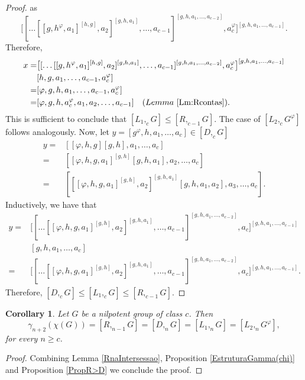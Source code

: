 \documentclass[12pt,leqno]{amsart}
\newtheorem{cor}[theorem]{\sc Corollary}
\begin{document}
\begin{proof}
        as
        \[
\big [ [\ldots[[g,h^{\varphi},a_{1}]^{[h,g]},a_{2}]^{[g,h,a_{1}]}, \ldots ,a_{c-1}]^{[g,h,a_{1}, \ldots ,a_{c-2}]} , a^{\varphi}_c \big]^{[g,h,a_{1}, \ldots, a_{c-1}]}.       
        \]
        Therefore, 
        \begin{align*} x=&\big [ [\ldots[[g,h^{\varphi},a_{1}]^{[h,g]},a_{2}]^{[g,h,a_{1}]}, \ldots ,a_{c-1}]^{[g,h,a_{1}, \ldots ,a_{c-2}]} , a^{\varphi}_c \big]^{[g,h,a_{1}, \ldots, a_{c-1}]} \\
        & [h,g,a_1, \ldots , a_{c-1}, a^{\varphi}_{c}]\\
        =& [\varphi,g,h,a_1,\ldots, a_{c-1},a^{\varphi}_{c}]\\
        =& [\varphi,g,h,a^{\varphi}_{c},a_1,a_2,\ldots, a_{c-1}] \ \ \ (Lemma\  \ref{Lm:Rcontas}).
    \end{align*}
    This is sufficient to conclude that $[L_1,_cG]\leq [R,_{c-1}G]$. The case of $[L_2,_cG^{\varphi}]$ follows analogously.  
Now, let $y=[g^{\varphi},h,a_1, \ldots, a_c]\in [D,_cG]$
    \begin{align*}
       y=& [[\varphi,h,g][g,h], a_1, \ldots, a_c]\\
        =& [[\varphi,h,g, a_1]^{[g,h]}[g,h,a_1],a_2, \ldots, a_c]\\
        =& [[[\varphi,h,g, a_1]^{[g,h]},a_2]^{[g,h,a_1]}[g,h,a_1,a_2],a_3, \ldots, a_c].
    \end{align*}
Inductively, we have that 
    \begin{align*}    
         y =&\big [ [\ldots[[\varphi,h,g, a_1]^{[g,h]},a_2]^{[g,h,a_1]}, \ldots ,a_{c-1}]^{[g,h,a_{1}, \ldots ,a_{c-2}]} , a_c \big]^{[g,h,a_{1}, \ldots, a_{c-1}]} \\
         & [g,h,a_1, \ldots, a_c]\\
        =& \big [ [\ldots[[\varphi,h,g, a_1]^{[g,h]},a_2]^{[g,h,a_1]}, \ldots ,a_{c-1}]^{[g,h,a_{1}, \ldots ,a_{c-2}]} , a_c \big]^{[g,h,a_{1}, \ldots, a_{c-1}]}.
    \end{align*}
Therefore, $[D,_cG]\leq [L_1,_cG]\leq [R,_{c-1}G]$.
\end{proof}

\begin{cor}\label{Cor:GammaCh}
Let $G$ be a nilpotent group of class $c$. Then 
\[
\gamma_{n+2}(\chi(G)) = [R,_{n-1}G] = [D,_nG]=[L_1,_nG]=[L_2,_nG^{\varphi}],
\]
for every $n\geq c$.
\end{cor}

\begin{proof}
Combining Lemma \ref{RnaIntersessao}, Proposition \ref{EstruturaGamma(chi)} and Proposition \ref{PropR>D} we conclude the proof.
\end{proof}
\end{document}
